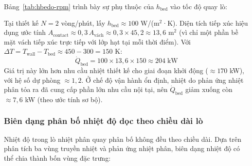 \documentclass[../main.tex]{subfiles}
\begin{document}
Bảng~\ref{tab:hbedo-rpm} trình bày sự phụ thuộc của $h_{\text{bed}}$ vào tốc độ quay lò:
\begin{table}[htbp]
\centering
\caption{Hệ số truyền nhiệt tiếp xúc $h_{\text{bed}}$ theo tốc độ quay lò}
\label{tab:hbedo-rpm}
\setlength{\tabcolsep}{4pt}
\end{table}

Tại thiết kế $N = 2$ vòng/phút, lấy $h_{\text{bed}} \approx 100$ W/(m$^2$·K). Diện tích tiếp xúc hiệu dụng ước tính $A_{\text{contact}} \approx 0{,}3 \, A_{\text{vách}} \approx 0{,}3 \times 45{,}2 \approx 13{,}6$ m$^2$ (vì chỉ một phần bề mặt vách tiếp xúc trực tiếp với lớp hạt tại mỗi thời điểm). Với $\Delta T = T_{\text{wall}} - T_{\text{bed}} \approx 450 - 300 = 150$ K:
\begin{equation}
  \dot{Q}_{\text{bed}} = 100 \times 13{,}6 \times 150 \approx 204 \;\text{kW}
  \label{eq:bed-heat-value}
\end{equation}
Giá trị này lớn hơn nhu cầu nhiệt thiết kế cho giai đoạn khởi động ($\approx 170$ kW), với hệ số dự phòng $\approx 1{,}2$. Ở chế độ vận hành ổn định, nhiệt do phản ứng nhiệt phân tỏa ra đã cung cấp phần lớn nhu cầu nội tại, nên $\dot{Q}_{\text{bed}}$ giảm xuống còn $\approx 7{,}6$ kW (theo ước tính sơ bộ).

\subsubsection{Biên dạng phân bố nhiệt độ dọc theo chiều dài lò}
\label{sec:bien-do-nhiet-do}

Nhiệt độ trong lò nhiệt phân quay phân bố không đều theo chiều dài. Dựa trên phân tích ba vùng truyền nhiệt và phản ứng nhiệt phân, biên dạng nhiệt độ có thể chia thành bốn vùng đặc trưng:
\end{document}
